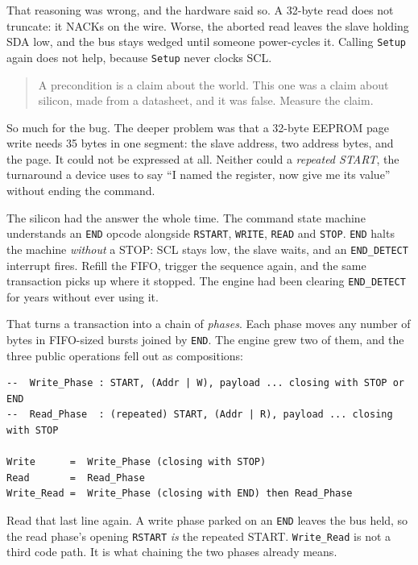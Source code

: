 That reasoning was wrong, and the hardware said so. A 32-byte read does not
truncate: it NACKs on the wire. Worse, the aborted read leaves the slave holding
SDA low, and the bus stays wedged until someone power-cycles it. Calling
\texttt{Setup} again does not help, because \texttt{Setup} never clocks SCL.

\begin{quote}
A precondition is a claim about the world. This one was a claim about silicon,
made from a datasheet, and it was false. Measure the claim.
\end{quote}


So much for the bug. The deeper problem was that a 32-byte EEPROM page write
needs 35 bytes in one segment: the slave address, two address bytes, and the page.
It could not be expressed at all. Neither could a \emph{repeated START}, the
turnaround a device uses to say ``I named the register, now give me its value''
without ending the command.

The silicon had the answer the whole time. The command state machine understands
an \texttt{END} opcode alongside \texttt{RSTART}, \texttt{WRITE}, \texttt{READ}
and \texttt{STOP}. \texttt{END} halts the machine \emph{without} a STOP: SCL stays
low, the slave waits, and an \texttt{END\_DETECT} interrupt fires. Refill the
FIFO, trigger the sequence again, and the same transaction picks up where it
stopped. The engine had been clearing \texttt{END\_DETECT} for years without ever
using it.

That turns a transaction into a chain of \emph{phases}. Each phase moves any
number of bytes in FIFO-sized bursts joined by \texttt{END}. The engine grew two
of them, and the three public operations fell out as compositions:

\begin{lstlisting}
--  Write_Phase : START, (Addr | W), payload ... closing with STOP or END
--  Read_Phase  : (repeated) START, (Addr | R), payload ... closing with STOP

Write      =  Write_Phase (closing with STOP)
Read       =  Read_Phase
Write_Read =  Write_Phase (closing with END) then Read_Phase
\end{lstlisting}

Read that last line again. A write phase parked on an \texttt{END} leaves the bus
held, so the read phase's opening \texttt{RSTART} \emph{is} the repeated START.
\texttt{Write\_Read} is not a third code path. It is what chaining the two phases
already means.

